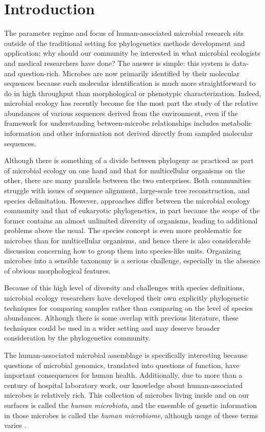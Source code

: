 \documentclass{amsart}
\begin{document}
\section{Introduction}

The parameter regime and focus of human-associated microbial research sits outside of the traditional setting for phylogenetics methods development and application; why should our community be interested in what microbial ecologists and medical researchers have done?
The answer is simple: this system is data- and question-rich.
Microbes are now primarily identified by their molecular sequences because such molecular identification is much more straightforward to do in high throughput than morphological or phenotypic characterization.
Indeed, microbial ecology has recently become for the most part the study of the relative abundances of various sequences derived from the environment, even if the framework for understanding between-microbe relationships includes metabolic information and other information not derived directly from sampled molecular sequences.

Although there is something of a divide between phylogeny as practiced as part of microbial ecology on one hand and that for multicellular organisms on the other, there are many parallels between the two enterprises.
Both communities struggle with issues of sequence alignment, large-scale tree reconstruction, and species delimitation.
However, approaches differ between the microbial ecology community and that of eukaryotic phylogenetics, in part because the scope of the former contains an almost unlimited diversity of organisms, leading to additional problems above the usual.
The species concept is even more problematic for microbes than for multicellular organisms, and hence there is also considerable discussion concerning how to group them into species-like units.
Organizing microbes into a sensible taxonomy is a serious challenge, especially in the absence of obvious morphological features.

Because of this high level of diversity and challenges with species definitions, microbial ecology researchers have developed their own explicitly phylogenetic techniques for comparing samples rather than comparing on the level of species abundances.
Although there is some overlap with previous literature, these techniques could be used in a wider setting and may deserve broader consideration by the phylogenetics community.

The human-associated microbial assemblage is specifically interesting because questions of microbial genomics, translated into questions of function, have important consequences for human health.
Additionally, due to more than a century of hospital laboratory work, our knowledge about human-associated microbes is relatively rich.
This collection of microbes living inside and on our surfaces is called the \textit{human microbiota}, and the ensemble of genetic information in those microbes is called the \textit{human microbiome}, although usage of these terms varies \citep{Boon2013-mc}.
\end{document}
